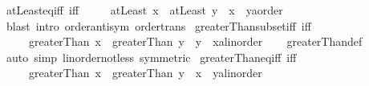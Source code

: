 \begin{isabellebody}
%
\isadelimproof
\isanewline
%
\endisadelimproof
\isanewline
{}\isamarkupfalse%
\ atLeast{\isacharunderscore}{\kern0pt}eq{\isacharunderscore}{\kern0pt}iff\ {\isacharbrackleft}{\kern0pt}iff{\isacharbrackright}{\kern0pt}{\isacharcolon}{\kern0pt}\isanewline
\ \ \ \ \ {\isachardoublequoteopen}{\isacharparenleft}{\kern0pt}atLeast\ x\ {\isacharequal}{\kern0pt}\ atLeast\ y{\isacharparenright}{\kern0pt}\ {\isacharequal}{\kern0pt}\ {\isacharparenleft}{\kern0pt}x\ {\isacharequal}{\kern0pt}\ {\isacharparenleft}{\kern0pt}y{\isacharcolon}{\kern0pt}{\isacharcolon}{\kern0pt}{\isacharprime}{\kern0pt}a{\isacharcolon}{\kern0pt}{\isacharcolon}{\kern0pt}order{\isacharparenright}{\kern0pt}{\isacharparenright}{\kern0pt}{\isachardoublequoteclose}\isanewline
%
\isadelimproof
%
\endisadelimproof
%
\isatagproof
{}\isamarkupfalse%
\ {\isacharparenleft}{\kern0pt}blast\ intro{\isacharcolon}{\kern0pt}\ order{\isacharunderscore}{\kern0pt}antisym\ order{\isacharunderscore}{\kern0pt}trans{\isacharparenright}{\kern0pt}%
\endisatagproof
{\isafoldproof}%
%
\isadelimproof
\isanewline
%
\endisadelimproof
\isanewline
{}\isamarkupfalse%
\ greaterThan{\isacharunderscore}{\kern0pt}subset{\isacharunderscore}{\kern0pt}iff\ {\isacharbrackleft}{\kern0pt}iff{\isacharbrackright}{\kern0pt}{\isacharcolon}{\kern0pt}\isanewline
\ \ \ \ \ {\isachardoublequoteopen}{\isacharparenleft}{\kern0pt}greaterThan\ x\ {\isasymsubseteq}\ greaterThan\ y{\isacharparenright}{\kern0pt}\ {\isacharequal}{\kern0pt}\ {\isacharparenleft}{\kern0pt}y\ {\isasymle}\ {\isacharparenleft}{\kern0pt}x{\isacharcolon}{\kern0pt}{\isacharcolon}{\kern0pt}{\isacharprime}{\kern0pt}a{\isacharcolon}{\kern0pt}{\isacharcolon}{\kern0pt}linorder{\isacharparenright}{\kern0pt}{\isacharparenright}{\kern0pt}{\isachardoublequoteclose}\isanewline
%
\isadelimproof
\ \ %
\endisadelimproof
%
\isatagproof
{}\isamarkupfalse%
\ greaterThan{\isacharunderscore}{\kern0pt}def\ \isamarkupfalse%
\ {\isacharparenleft}{\kern0pt}auto\ simp{\isacharcolon}{\kern0pt}\ linorder{\isacharunderscore}{\kern0pt}not{\isacharunderscore}{\kern0pt}less\ {\isacharbrackleft}{\kern0pt}symmetric{\isacharbrackright}{\kern0pt}{\isacharparenright}{\kern0pt}%
\endisatagproof
{\isafoldproof}%
%
\isadelimproof
\isanewline
%
\endisadelimproof
\isanewline
{}\isamarkupfalse%
\ greaterThan{\isacharunderscore}{\kern0pt}eq{\isacharunderscore}{\kern0pt}iff\ {\isacharbrackleft}{\kern0pt}iff{\isacharbrackright}{\kern0pt}{\isacharcolon}{\kern0pt}\isanewline
\ \ \ \ \ {\isachardoublequoteopen}{\isacharparenleft}{\kern0pt}greaterThan\ x\ {\isacharequal}{\kern0pt}\ greaterThan\ y{\isacharparenright}{\kern0pt}\ {\isacharequal}{\kern0pt}\ {\isacharparenleft}{\kern0pt}x\ {\isacharequal}{\kern0pt}\ {\isacharparenleft}{\kern0pt}y{\isacharcolon}{\kern0pt}{\isacharcolon}{\kern0pt}{\isacharprime}{\kern0pt}a{\isacharcolon}{\kern0pt}{\isacharcolon}{\kern0pt}linorder{\isacharparenright}{\kern0pt}{\isacharparenright}{\kern0pt}{\isachardoublequoteclose}\isanewline

\end{isabellebody}
